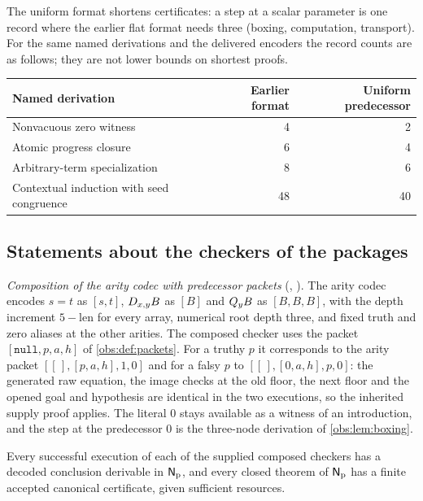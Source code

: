 The uniform format shortens certificates: a step at a scalar parameter is one
record where the earlier flat format needs three (boxing, computation,
transport). For the same named derivations and the delivered encoders the
record counts are as follows; they are not lower bounds on shortest proofs.

\begin{center}
\begin{tabular}{lrr}
\toprule
Named derivation & Earlier format & Uniform predecessor\\
\midrule
Nonvacuous zero witness & 4 & 2\\
Atomic progress closure & 6 & 4\\
Arbitrary-term specialization & 8 & 6\\
Contextual induction with seed congruence & 48 & 40\\
\bottomrule
\end{tabular}
\end{center}

\subsection{Statements about the checkers of the packages}

\emph{Composition of the arity codec with predecessor packets}
(, ). The arity codec encodes
$s=t$ as $[s,t]$, $D_{x,y}B$ as $[B]$ and $Q_{y}B$ as $[B,B,B]$, with the
depth increment $5-\mathrm{len}$ for every array, numerical root depth three,
and fixed truth and zero aliases at the other arities. The composed checker
uses the packet $[\mathtt{null},p,a,h]$ of \cref{obs:def:packets}. For a
truthy $p$ it corresponds to the arity packet $[[\,],[p,a,h],1,0]$ and for a
falsy $p$ to $[[\,],[0,a,h],p,0]$: the generated raw equation, the image
checks at the old floor, the next floor and the opened goal and hypothesis are
identical in the two executions, so the inherited supply proof applies. The
literal $0$ stays available as a witness of an introduction, and the step at
the predecessor $0$ is the three-node derivation of \cref{obs:lem:boxing}.

\begin{theorem}
\label{obs:thm:composed}
Every successful execution of each of the supplied composed checkers has a
decoded conclusion derivable in $\mathsf{N}_{\mathrm{p}}$, and every closed theorem
of $\mathsf{N}_{\mathrm{p}}$ has a finite accepted canonical certificate, given
sufficient resources.
\end{theorem}

